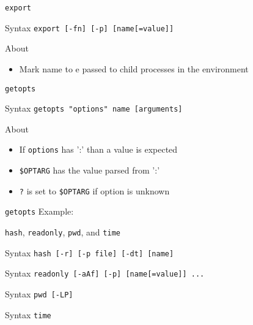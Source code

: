 \documentclass[10pt, compress, aspectratio=169]{beamer}
\begin{document}
\begin{frame}{\texttt{export}}
  \begin{alertblock}{Syntax}
    \texttt{export [-fn] [-p] [name[=value]]}
  \end{alertblock}

  \begin{exampleblock}{About}
    \begin{itemize}
      \item Mark name to e passed to child processes in the environment
    \end{itemize}
  \end{exampleblock}

\end{frame}

\begin{frame}{\texttt{getopts}}
  \begin{alertblock}{Syntax}
    \texttt{getopts "options" name [arguments]}
  \end{alertblock}

  \begin{exampleblock}{About}
    \begin{itemize}
      \item If \texttt{options} has ':' than a value is expected
      \item \texttt{\$OPTARG} has the value parsed from ':'
      \item \texttt{?} is set to \texttt{\$OPTARG} if option is unknown
    \end{itemize}
  \end{exampleblock}
\end{frame}

\begin{frame}{\texttt{getopts}}
  Example:
  
\end{frame}

\begin{frame}{\texttt{hash}, \texttt{readonly}, \texttt{pwd}, and \texttt{time}}

  \begin{alertblock}{Syntax}
    \texttt{hash [-r] [-p file] [-dt] [name]}
  \end{alertblock}

  \begin{alertblock}{Syntax}
    \texttt{readonly [-aAf] [-p] [name[=value]] ...}
  \end{alertblock}

  \begin{alertblock}{Syntax}
    \texttt{pwd [-LP]}
  \end{alertblock}

  \begin{alertblock}{Syntax}
    \texttt{time}
  \end{alertblock}
\end{frame}
\end{document}

